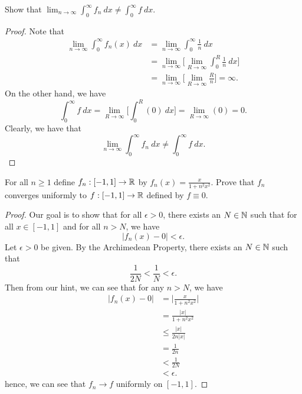 \documentclass[a4paper]{article}
\begin{document}
\begin{problem}[ii]
   Show that \( \lim_{ n \to \infty  }  \int_{ 0 }^{ \infty  }  {f}_{n} \ dx \neq \int_{ 0 }^{ \infty   } f  \ dx  \). 
\end{problem}

\begin{proof}
Note that 
\begin{align*}
    \lim_{ n \to \infty  }  \int_{ 0 }^{ \infty  }  {f}_{n}(x) \ dx &= \lim_{ n \to \infty  }  \int_{ 0 }^{ \infty  }  \frac{ 1 }{ n }  \ dx  \\
                                                                    &= \lim_{ n \to \infty  }  \Big[ \lim_{ R \to \infty  }  \int_{ 0 }^{ R }  \frac{ 1 }{ n }  \ dx  \Big] \\
                                                                    &= \lim_{ n \to \infty  }  \Big[ \lim_{ R \to \infty  }  \frac{ R }{ n } \Big] = \infty.
\end{align*}
On the other hand, we have 
\[ \int_{ 0 }^{ \infty  }  f  \ dx = \lim_{ R \to \infty  }  \Big[ \int_{ 0 }^{ R  }  (0) \ dx \Big] = \lim_{ R \to \infty  } (0) = 0.  \]
Clearly, we have that 
\[  \lim_{ n \to \infty  }  \int_{ 0 }^{ \infty  }  {f}_{n} \ dx \neq \int_{ 0  }^{ \infty  }  f  \ dx. \]
\end{proof}

\begin{problem}[(i)]
    For all \( n \geq 1  \) define \( {f}_{n}: [-1,1] \to \mathbb{R}  \) by \( {f}_{n}(x) = \frac{ x  }{  1 + n^{2} x^{2} }  \). Prove that \( {f}_{n}  \) converges uniformly to \( f: [-1,1] \to \mathbb{R}  \) defined by \( f \equiv 0  \). 
\end{problem}
\begin{proof}
    Our goal is to show that for all \( \epsilon > 0  \), there exists an \( N \in \mathbb{N} \) such that for all \( x \in [-1,1]  \) and for all \(  n > N  \), we have 
    \[  | {f}_{n}(x) - 0  | < \epsilon. \]
    Let \( \epsilon > 0 \) be given. By the Archimedean Property, there exists an \( N \in \mathbb{N}  \) such that  
    \[  \frac{ 1 }{ 2N } < \frac{ 1 }{ N  } < \epsilon. \]
    Then from our hint, we can see that for any \( n > N  \), we have
    \begin{align*}
        | {f}_{n}(x) - 0 | &= \Big| \frac{ x  }{ 1 + n^{2} x^{2} }  \Big|  \\
                           &= \frac{ | x  |   }{  1 + n^{2} x^{2} } \\
                           &\leq \frac{  | x  |  }{ 2n | x  |   }  \\
                           &= \frac{ 1 }{ 2n }  \\
                           &< \frac{ 1  }{ 2N  }  \\
                           &< \epsilon.
    \end{align*}
    hence, we can see that \( {f}_{n} \to f   \) uniformly on \( [-1,1] \).
\end{proof}
\end{document}
